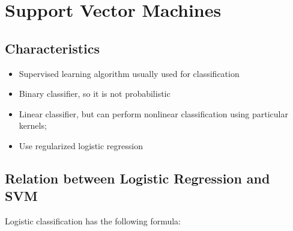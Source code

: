 \section{Support Vector Machines}

\subsection{Characteristics}
\begin{itemize}
    \item Supervised learning algorithm usually used for classification
    \item Binary classifier, so it is not probabilistic
    \item Linear classifier, but can perform nonlinear classification using particular kernels;
    \item Use regularized logistic regression
\end{itemize}

\subsection{Relation between Logistic Regression and SVM}
Logistic classification has the following formula:

